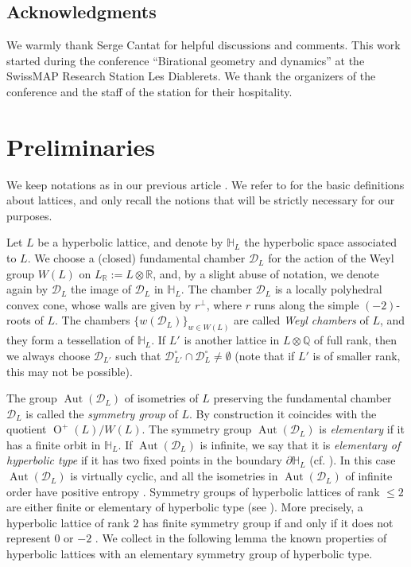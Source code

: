 \documentclass[11pt,letterpaper]{amsart}
\DeclareMathOperator{\Aut}{Aut}
\DeclareMathOperator{\Or}{O}
\newcommand{\QQ}{\mathbb{Q}}
\newcommand{\RR}{\mathbb{R}}
\newcommand{\HH}{\mathbb{H}}
\newcommand{\D}{\mathcal{D}}
\theoremstyle{definition}
\theoremstyle{remark}
\begin{document}
\subsection*{Acknowledgments}
We warmly thank Serge Cantat for helpful discussions and comments.  This work started during the conference ``Birational geometry and dynamics'' at the SwissMAP Research Station Les Diablerets. We thank the organizers of the conference and the staff of the station for their hospitality.


\section{Preliminaries} \label{sec:preliminaries}

We keep notations as in our previous article \cite{brandhorst.mezzedimi}. We refer to \cite[§2]{brandhorst.mezzedimi} for the basic definitions about lattices, and only recall the notions that will be strictly necessary for our purposes.

Let $L$ be a hyperbolic lattice, and denote by $\HH_L$ the hyperbolic space associated to $L$. We choose a (closed) fundamental chamber $\D_L$ for the action of the Weyl group $W(L)$ on $L_\RR:=L \otimes \RR$, and, by a slight abuse of notation, we denote again by $\D_L$ the image of $\D_L$ in $\HH_L$. The chamber $\D_L$ is a locally polyhedral convex cone, whose walls are given by $r^\perp$, where $r$ runs along the simple $(-2)$-roots of $L$. The chambers $\{w(\D_L)\}_{w\in W(L)}$ are called \emph{Weyl chambers} of $L$, and they form a tessellation of $\HH_L$.
If $L'$ is another lattice in $L\otimes \QQ$ of full rank, then we always choose $\D_{L'}$ such that $\D_{L'}^\circ\cap \D_{L}^\circ\ne\emptyset$ (note that if $L'$ is of smaller rank, this may not be possible).

The group $\Aut(\D_L)$ of isometries of $L$ preserving the fundamental chamber $\D_L$ is called the \emph{symmetry group} of $L$. By construction it coincides with the quotient $\Or^+(L)/W(L)$. The symmetry group $\Aut(\D_L)$ is \emph{elementary} if it has a finite orbit in $\HH_L$. If $\Aut(\D_L)$ is infinite, we say that it is \emph{elementary of hyperbolic type} if it has two fixed points in the boundary $\partial \HH_L$ (cf. \cite[§5.5]{ratcliffe}). In this case $\Aut(\D_L)$ is virtually cyclic, and all the isometries in $\Aut(\D_L)$ of infinite order have positive entropy \cite[Theorem~5.5.8]{ratcliffe}. Symmetry groups of hyperbolic lattices of rank $\le 2$ are either finite or elementary of hyperbolic type (see \cite{galluzzi.lombardo.peters}). More precisely, a hyperbolic lattice of rank $2$ has finite symmetry group if and only if it does not represent $0$ or $-2$ \cite[Corollary~3.4]{galluzzi.lombardo.peters}. We collect in the following lemma the known properties of hyperbolic lattices with an elementary symmetry group of hyperbolic type.
\end{document}
